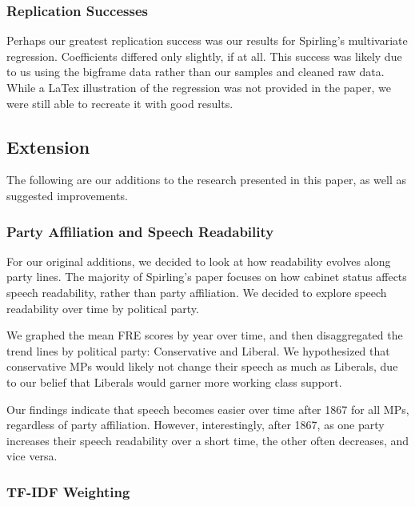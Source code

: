 \documentclass[
  letterpaper,
  DIV=11,
  numbers=noendperiod]{scrartcl}
\begin{document}
\subsubsection{Replication Successes}\label{replication-successes}

Perhaps our greatest replication success was our results for Spirling's
multivariate regression. Coefficients differed only slightly, if at all.
This success was likely due to us using the bigframe data rather than
our samples and cleaned raw data. While a LaTex illustration of the
regression was not provided in the paper, we were still able to recreate
it with good results.

\subsection{Extension}\label{extension}

The following are our additions to the research presented in this paper,
as well as suggested improvements.

\subsubsection{Party Affiliation and Speech
Readability}\label{party-affiliation-and-speech-readability}

For our original additions, we decided to look at how readability
evolves along party lines. The majority of Spirling's paper focuses on
how cabinet status affects speech readability, rather than party
affiliation. We decided to explore speech readability over time by
political party.

We graphed the mean FRE scores by year over time, and then disaggregated
the trend lines by political party: Conservative and Liberal. We
hypothesized that conservative MPs would likely not change their speech
as much as Liberals, due to our belief that Liberals would garner more
working class support.

Our findings indicate that speech becomes easier over time after 1867
for all MPs, regardless of party affiliation. However, interestingly,
after 1867, as one party increases their speech readability over a short
time, the other often decreases, and vice versa.

\subsubsection{TF-IDF Weighting}\label{tf-idf-weighting}
\end{document}
